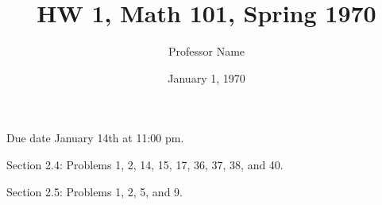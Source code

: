 \documentclass{article}
\title{HW 1, Math 101, Spring 1970}
\author{Professor Name}
\date{January 1, 1970}
\begin{document}
\maketitle
Due date January 14th at 11:00 pm. \bigskip

Section 2.4: Problems 1, 2, 14, 15, 17, 36, 37, 38, and 40.

Section 2.5: Problems 1, 2, 5, and 9.
\end{document}
